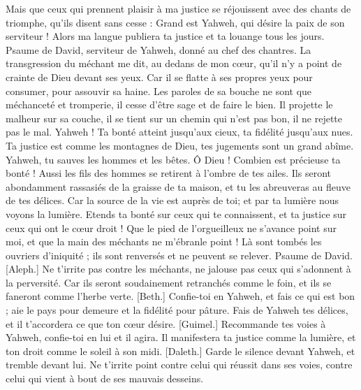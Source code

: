\begin{multicols}{2}
Mais que ceux qui prennent plaisir à ma justice se réjouissent avec des chants de triomphe, qu'ils disent sans cesse : Grand est Yahweh, qui désire la paix de son serviteur !
Alors ma langue publiera ta justice et ta louange tous les jours.
\VerseOne{}Psaume de David, serviteur de Yahweh, donné au chef des chantres.
La transgression du méchant me dit, au dedans de mon cœur, qu'il n'y a point de crainte de Dieu devant ses yeux.
Car il se flatte à ses propres yeux pour consumer, pour assouvir sa haine.
Les paroles de sa bouche ne sont que méchanceté et tromperie, il cesse d'être sage et de faire le bien.
Il projette le malheur sur sa couche, il se tient sur un chemin qui n'est pas bon, il ne rejette pas le mal.
Yahweh ! Ta bonté atteint jusqu'aux cieux, ta fidélité jusqu'aux nues.
Ta justice est comme les montagnes de Dieu, tes jugements sont un grand abîme. Yahweh, tu sauves les hommes et les bêtes.
Ô Dieu ! Combien est précieuse ta bonté ! Aussi les fils des hommes se retirent à l'ombre de tes ailes.
Ils seront abondamment rassasiés de la graisse de ta maison, et tu les abreuveras au fleuve de tes délices.
Car la source de la vie est auprès de toi; et par ta lumière nous voyons la lumière.
Etends ta bonté sur ceux qui te connaissent, et ta justice sur ceux qui ont le cœur droit !
Que le pied de l'orgueilleux ne s'avance point sur moi, et que la main des méchants ne m'ébranle point !
Là sont tombés les ouvriers d'iniquité ; ils sont renversés et ne peuvent se relever.
\VerseOne{}Psaume de David. [Aleph.] Ne t'irrite pas contre les méchants, ne jalouse pas ceux qui s'adonnent à la perversité.
Car ils seront soudainement retranchés comme le foin, et ils se faneront comme l'herbe verte.
[Beth.] Confie-toi en Yahweh, et fais ce qui est bon ; aie le pays pour demeure et la fidélité pour pâture.
Fais de Yahweh tes délices, et il t'accordera ce que ton cœur désire.
[Guimel.] Recommande tes voies à Yahweh, confie-toi en lui et il agira.
Il manifestera ta justice comme la lumière, et ton droit comme le soleil à son midi.
[Daleth.] Garde le silence devant Yahweh, et tremble devant lui. Ne t'irrite point contre celui qui réussit dans ses voies, contre celui qui vient à bout de ses mauvais desseins.

\end{multicols}
